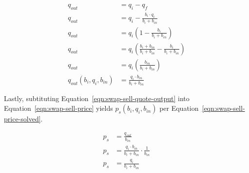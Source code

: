 \documentclass[table, twocolumn]{article}
\begin{document}
\begin{align}\label{eqn:swap-sell-quote-output}
  q_{out} &= q_i - q_f \nonumber \\
  q_{out} &= q_i - \frac{b_i \cdot q_i}{b_i + b_{in}} \nonumber \\
  q_{out} &= q_i \left( 1 - \frac{b_i}{b_i + b_{in}} \right) \nonumber \\
  q_{out} &= q_i \left(
    \frac{b_i + b_{in}}{b_i + b_{in}} - \frac{b_i}{b_i + b_{in}}
  \right) \nonumber \\
  q_{out} &= q_i \left( \frac{b_{in}}{b_i + b_{in}} \right) \nonumber \\
  q_{out} (b_i, q_i, b_{in}) &= \frac{q_i \cdot b_{in}}{b_i + b_{in}}
\end{align}

Lastly, subtituting Equation~\ref{eqn:swap-sell-quote-output} into
Equation~\ref{eqn:swap-sell-price} yields $p_s(b_i, q_i, b_{in})$ per
Equation~\ref{eqn:swap-sell-price-solved}.

\begin{align}\label{eqn:swap-sell-price-solved}
  p_s &= \frac{q_{out}}{b_{in}} \nonumber \\
  p_s &= \frac{q_i \cdot b_{in}}{b_i + b_{in}} \cdot \frac{1}{b_{in}} \nonumber \\
  p_s &= \frac{q_i}{b_i + b_{in}}
\end{align}
\end{document}
